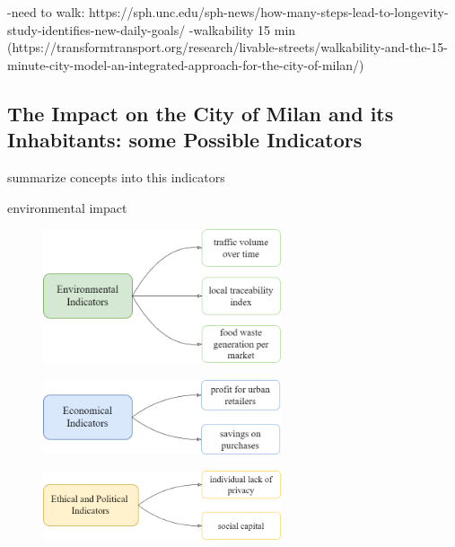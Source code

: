 -need to walk: https://sph.unc.edu/sph-news/how-many-steps-lead-to-longevity-study-identifies-new-daily-goals/
-walkability 15 min (https://transformtransport.org/research/livable-streets/walkability-and-the-15-minute-city-model-an-integrated-approach-for-the-city-of-milan/)

\subsection{The Impact on the City of Milan and its Inhabitants: some Possible Indicators}


summarize concepts into this indicators

    environmental impact

    \begin{figure}[h!]
        \centering
        \includegraphics[width=7cm]{figs/env}
        \label{fig:env}
      \end{figure}
      
 
    \begin{figure}[h!]
        \centering
        \includegraphics[width=7cm]{figs/econ}
        \label{fig:env}
      \end{figure}


    \begin{figure}[h!]
        \centering
        \includegraphics[width=7cm]{figs/health}
        \label{fig:env}
      \end{figure}

